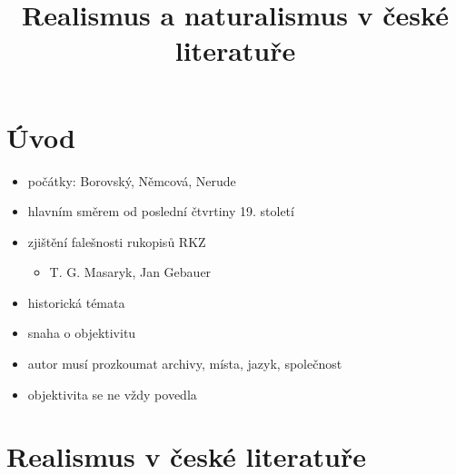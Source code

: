 \title{Realismus a naturalismus v české literatuře}


\section{Úvod}
\begin{itemize}
\item počátky: Borovský, Němcová, Nerude
\item hlavním směrem od poslední čtvrtiny 19. století
\item zjištění falešnosti rukopisů RKZ
	\begin{itemize}
	\item T. G. Masaryk, Jan Gebauer
	\end{itemize}
\item historická témata
\item snaha o objektivitu
\item autor musí prozkoumat archivy, místa, jazyk, společnost
\item objektivita se ne vždy povedla
\end{itemize}

\section{Realismus v české literatuře}
